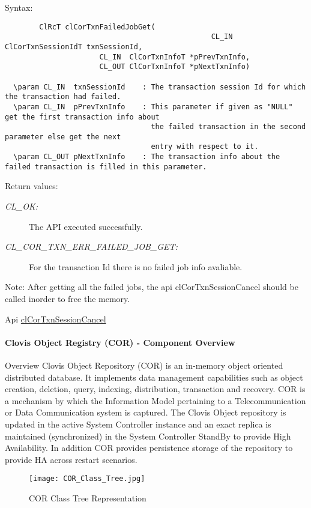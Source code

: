 \begin{Desc}
\item[Syntax:]

\footnotesize\begin{verbatim}        ClRcT clCorTxnFailedJobGet( 
                                                CL_IN  ClCorTxnSessionIdT txnSessionId, 
                      CL_IN  ClCorTxnInfoT *pPrevTxnInfo, 
                      CL_OUT ClCorTxnInfoT *pNextTxnInfo)

  \param CL_IN  txnSessionId    : The transaction session Id for which the transaction had failed.
  \param CL_IN  pPrevTxnInfo    : This parameter if given as "NULL" get the first transaction info about 
                                  the failed transaction in the second parameter else get the next
                                  entry with respect to it.
  \param CL_OUT pNextTxnInfo    : The transaction info about the failed transaction is filled in this parameter.
\end{verbatim}
\normalsize
\end{Desc}
\begin{Desc}
\item[Return values:]
\begin{description}
\item[{\em CL\_\-OK:}]The API executed successfully. \item[{\em CL\_\-COR\_\-TXN\_\-ERR\_\-FAILED\_\-JOB\_\-GET:}]For the transaction Id there is no failed job info avaliable.\end{description}
\end{Desc}
\begin{Desc}
\item[Note:]After getting all the failed jobs, the api cl\-Cor\-Txn\-Session\-Cancel should be called inorder to free the memory.\end{Desc}
Api \hyperlink{group__group13_ga68}{cl\-Cor\-Txn\-Session\-Cancel} \hypertarget{pagecor000}{}\paragraph{Clovis Object Registry (COR) - Component Overview}\label{pagecor000}
\begin{Desc}
\item[Overview]Clovis Object Repository (COR) is an in-memory object oriented distributed database. It implements data management capabilities such as object creation, deletion, query, indexing, distribution, transaction and recovery. COR is a mechanism by which the Information Model pertaining to a Telecommunication or Data Communication system is captured. The Clovis Object repository is updated in the active System Controller instance and an exact replica is maintained (synchronized) in the System Controller Stand\-By to provide High Availability. In addition COR provides persistence storage of the repository to provide HA across restart scenarios.\end{Desc}
 \begin{figure}[H]
\begin{center}
\texttt{[image: COR\_Class\_Tree.jpg]}\caption{COR Class Tree Representation}
\end{center}
\end{figure}


